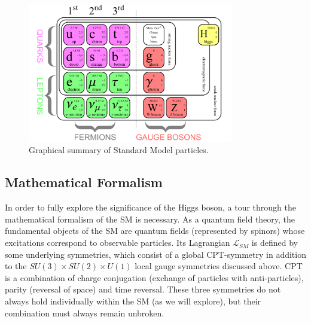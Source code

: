 \begin{figure}
\centering
    \includegraphics[width=0.8\textwidth]{images/Standard_Model.png}
    \caption{Graphical summary of Standard Model particles.}
    \label{fig:Standard_Model}
\end{figure}

\subsection{Mathematical Formalism}

In order to fully explore the significance of the Higgs boson, a tour through the mathematical formalism of the 
SM is necessary. As a quantum field theory, the fundamental objects of the SM are quantum fields (represented 
by spinors) whose excitations correspond to observable particles. Its Lagrangian $\mathcal{L}_{SM}$ is defined 
by some underlying symmetries, which consist of a global CPT-symmetry in addition to the 
$SU(3)\times SU(2)\times U(1)$ local gauge symmetries discussed above. CPT is a combination of charge 
conjugation (exchange of particles with anti-particles), parity (reversal of space) and time reversal. These three 
symmetries do not always hold individually within the SM (as we will explore), but their combination must always 
remain unbroken. \par


